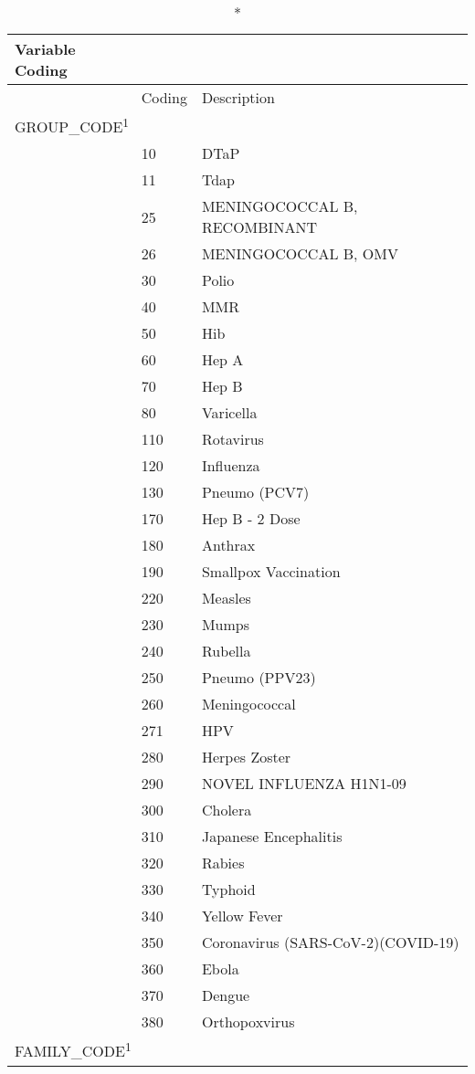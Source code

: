 \documentclass[
  letterpaper,
  DIV=11,
  numbers=noendperiod]{scrreprt}
\begin{document}
\setlength{\LTpost}{0mm}
\begin{longtable}{l|ll}
\caption*{
{\large Variable Coding}
} \\ 
\toprule
\multicolumn{1}{l}{} & Coding & Description \\ 
\midrule
\multicolumn{3}{l}{GROUP\_CODE\textsuperscript{1}} \\ 
\midrule
  & 10 & DTaP \\ 
  & 11 & Tdap \\ 
  & 25 & MENINGOCOCCAL B, RECOMBINANT \\ 
  & 26 & MENINGOCOCCAL B, OMV \\ 
  & 30 & Polio \\ 
  & 40 & MMR \\ 
  & 50 & Hib \\ 
  & 60 & Hep A \\ 
  & 70 & Hep B \\ 
  & 80 & Varicella \\ 
  & 110 & Rotavirus \\ 
  & 120 & Influenza \\ 
  & 130 & Pneumo (PCV7) \\ 
  & 170 & Hep B - 2 Dose \\ 
  & 180 & Anthrax \\ 
  & 190 & Smallpox Vaccination \\ 
  & 220 & Measles \\ 
  & 230 & Mumps \\ 
  & 240 & Rubella \\ 
  & 250 & Pneumo (PPV23) \\ 
  & 260 & Meningococcal \\ 
  & 271 & HPV \\ 
  & 280 & Herpes Zoster \\ 
  & 290 & NOVEL INFLUENZA H1N1-09 \\ 
  & 300 & Cholera \\ 
  & 310 & Japanese Encephalitis \\ 
  & 320 & Rabies \\ 
  & 330 & Typhoid \\ 
  & 340 & Yellow Fever \\ 
  & 350 & Coronavirus (SARS-CoV-2)(COVID-19) \\ 
  & 360 & Ebola \\ 
  & 370 & Dengue \\ 
  & 380 & Orthopoxvirus \\ 
\midrule
\multicolumn{3}{l}{FAMILY\_CODE\textsuperscript{1}} \\ 

\end{longtable}
\end{document}
